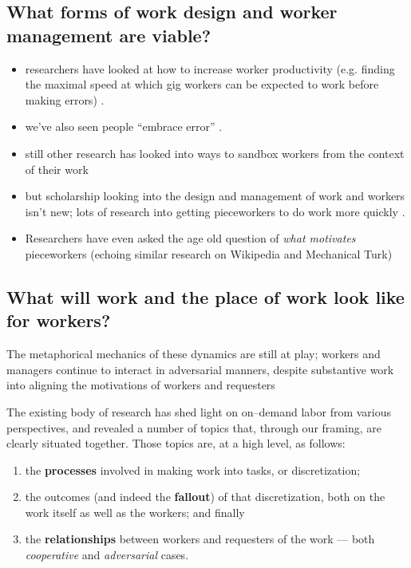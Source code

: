 \documentclass[trackingWork]{subfiles}
\begin{document}
{\begin{appendices}
\subsection{What forms of work design and worker management are viable?}
\begin{itemize}
  \item researchers have looked at how to increase worker productivity
  (e.g. finding the maximal speed at which gig workers can be expected to work before making errors)
  \cite{measuringCrowdsourcingCheng}.
  \item we've also seen people ``embrace error''
  \cite{embracingErrorKrishna}.
  \item still other research has looked into ways to sandbox workers from the context of their work 
  \item but scholarship looking into the design and management of work and workers isn't new;
  lots of research into getting pieceworkers to do work more quickly
  \cite{seymour1954manual}.
  \item Researchers have even asked the age old question of \textit{what motivates} pieceworkers
  (echoing similar research on Wikipedia and Mechanical Turk)
  \cite{roy1953work,Nov:2007:MW:1297797.1297798,kaufmann2011more}
\end{itemize}


\subsection{What will work and the place of work look like for workers?}
The metaphorical mechanics of these dynamics are still at play;
workers and managers continue to interact in adversarial manners,
despite substantive work into aligning the motivations of workers and requesters






    The existing body of research has shed light on on--demand labor from various perspectives,
    and revealed a number of topics that,
    through our framing, are clearly situated together.
    Those topics are, at a high level, as follows:
    \begin{enumerate}
    \item the \textbf{processes} involved in making work into tasks, or discretization;
    \item the outcomes (and indeed the \textbf{fallout}) of that discretization,
    both on the work itself as well as the workers;
    and finally
    \item the \textbf{relationships} between workers and requesters of the work
    --- both \textit{cooperative} and \textit{adversarial} cases.
    \end{enumerate}


\end{appendices}}
\end{document}
